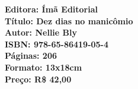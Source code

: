 \vfill

\hspace*{-.4cm}\begin{minipage}[c]{.5\linewidth}
\small\textbf{
\hspace*{-.1cm}Editora: Ímã Editorial\\
Título: Dez dias no manicômio\\
Autor: Nellie Bly\\ 
ISBN: 978-65-86419-05-4\\
Páginas: 206\\
Formato: 13x18cm\\
Preço: R\$ 42,00\\
}
\end{minipage}

\pagebreak

\vspace*{1.5cm}


\bigskip

\hfill{}\scalebox{.8}{DANIELA ARBEX}

\bigskip
\bigskip
\bigskip


